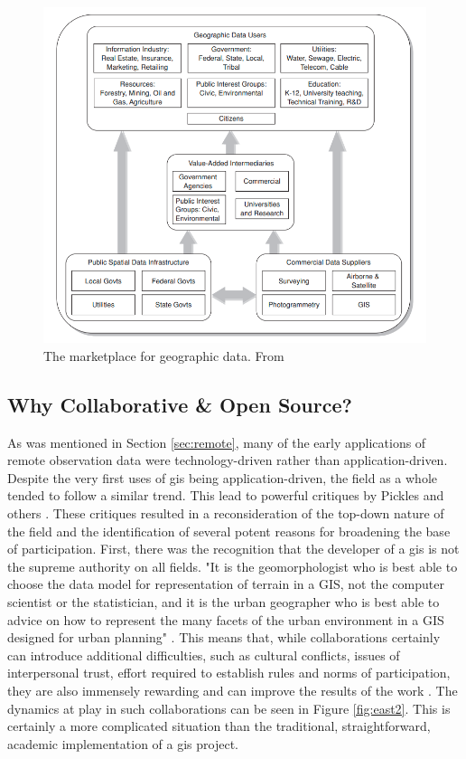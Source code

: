 \begin{figure}[!htb]
	\centering
	\includegraphics[scale=0.4]{Figures/chap2/GISMarketplace.png}
	\caption[The marketplace for geographic data]{The marketplace for geographic data. From \cite{cowenAvailabilityGeographicData2007}}
	\label{fig:marketplace}
\end{figure}

\subsection{Why Collaborative \& Open Source?} \label{sec:collaborative}

As was mentioned in Section \ref{sec:remote}, many of the early applications of remote observation data were technology-driven rather than application-driven. Despite the very first uses of \ac{gis} being application-driven, the field as a whole tended to follow a similar trend. This lead  to powerful critiques by Pickles and others \cite{picklesGroundTruthSocial1994}. These critiques resulted in a reconsideration of the top-down nature of the field and the identification of several potent reasons for broadening the base of participation. First, there was the recognition that the developer of a \ac{gis} is not the supreme authority on all fields. "It is the geomorphologist who is best able to choose the data model for representation of terrain in a GIS, not the computer scientist or the statistician, and it is the urban geographer who is best able to advice on how to represent the many facets of the urban environment in a GIS designed for urban planning" \cite{goodchildGeographicInformationSystems1994}. This means that, while collaborations certainly can introduce additional difficulties, such as cultural conflicts, issues of interpersonal trust, effort required to establish rules and norms of participation, they are also immensely rewarding and can improve the results of the work \cite{tullochInstitutionalGeographicInformation2007}. The dynamics at play in such collaborations can be seen in Figure \ref{fig:east2}. This is certainly a more complicated situation than the traditional, straightforward, academic implementation of a \ac{gis} project.

